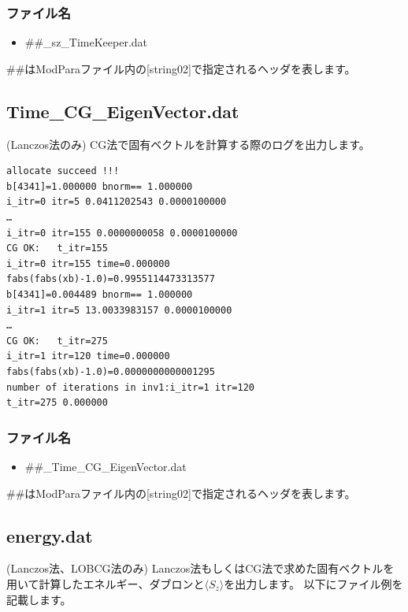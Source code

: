 \subsubsection{ファイル名}
 \begin{itemize}
   \item  \#\#\_sz\_TimeKeeper.dat
  \end{itemize}
  \#\#はModParaファイル内の[string02]で指定されるヘッダを表します。

\newpage
\subsection{Time\_CG\_EigenVector.dat}
\label{Subsec:timecgeigenv}
(Lanczos法のみ) CG法で固有ベクトルを計算する際のログを出力します。

\begin{minipage}{12.5cm}
\begin{screen}
\begin{verbatim}
allocate succeed !!! 
b[4341]=1.000000 bnorm== 1.000000 
i_itr=0 itr=5 0.0411202543 0.0000100000 
…
i_itr=0 itr=155 0.0000000058 0.0000100000 
CG OK:   t_itr=155 
i_itr=0 itr=155 time=0.000000  
fabs(fabs(xb)-1.0)=0.9955114473313577
b[4341]=0.004489 bnorm== 1.000000 
i_itr=1 itr=5 13.0033983157 0.0000100000 
…
CG OK:   t_itr=275 
i_itr=1 itr=120 time=0.000000  
fabs(fabs(xb)-1.0)=0.0000000000001295
number of iterations in inv1:i_itr=1 itr=120 
t_itr=275 0.000000
\end{verbatim}
\end{screen}
\end{minipage}
\subsubsection{ファイル名}
\begin{itemize}
   \item  \#\#\_Time\_CG\_EigenVector.dat
 \end{itemize}
  \#\#はModParaファイル内の[string02]で指定されるヘッダを表します。


\newpage
\subsection{energy.dat}
\label{subsec:energy.dat}
(Lanczos法、LOBCG法のみ) Lanczos法もしくはCG法で求めた固有ベクトルを用いて計算したエネルギー、ダブロン{と$\langle S_z \rangle$}を出力します。
以下にファイル例を記載します。\\

